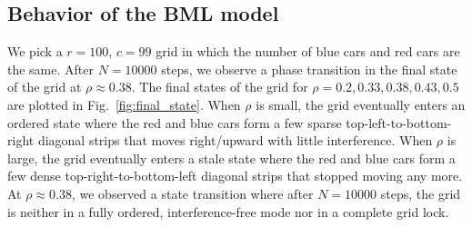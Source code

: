 \documentclass[twocolumn]{article}
\begin{document}
\subsection{Behavior of the BML model}
We pick a $r=100$, $c=99$ grid in which the number of blue cars and red cars
are the same. After $N = 10000$ steps, we observe a phase transition in the
final state of the grid at $\rho\approx 0.38$. The final states of the grid for
$\rho = 0.2, 0.33, 0.38, 0.43, 0.5$ are plotted in Fig.~\ref{fig:final_state}.
When $\rho$ is small, the grid eventually enters an ordered state where the red
and blue cars form a few sparse top-left-to-bottom-right diagonal strips that
moves right/upward with little interference. When $\rho$ is large, the grid eventually
enters a stale state where the red and blue cars form a few dense
top-right-to-bottom-left diagonal strips that stopped moving any more. At
$\rho\approx 0.38$, we observed a state transition where after $N = 10000$
steps, the grid is neither in a fully ordered, interference-free mode nor in a
complete grid lock.
\end{document}
